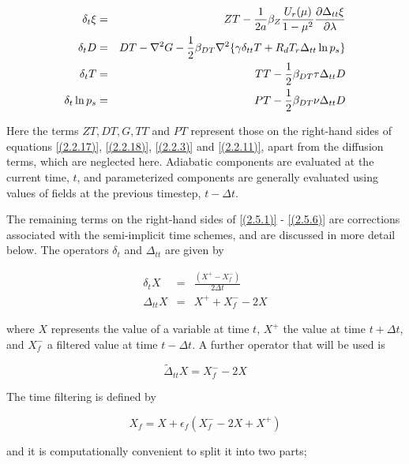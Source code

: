 \begin{eqnarray}
\delta_t\xi & = & ZT -\frac{1}{2a}\beta_{Z}\frac{U_r(\mu)}{1-\mu^2}
\frac {\partial \Delta_{tt}\xi} {\partial \lambda}
\label{(2.5.1)}\\
\delta_tD & = & DT - \nabla^2G -\frac{1}{2}\beta_{DT}\nabla^2
\{\gamma\delta_{tt}T + R_dT_r\Delta_{tt}\ln{p_s}\}
\label{(2.5.4)}\\
\delta_tT & = &  TT -\frac{1}{2}\beta_{DT}\tau
\Delta_{tt}D
\label{(2.5.5)}\\
\delta_t\ln{p_s} & = &  PT -\frac{1}{2}\beta_{DT}\nu
\Delta_{tt}D
\label{(2.5.6)}
\end{eqnarray}

Here the terms $ZT, DT, G, TT$ and $PT$ represent those on the
right-hand sides of equations \ref{(2.2.17)}, \ref{(2.2.18)},
\ref{(2.2.3)} and \ref{(2.2.11)}, apart from the diffusion terms,
which are neglected here. Adiabatic components are evaluated at the
current time, $t$, and parameterized components are generally evaluated
using values of fields at the previous timestep, $t-\Delta t$.

The remaining terms on the right-hand sides of \ref{(2.5.1)} - \ref{(2.5.6)}
 are corrections associated with the semi-implicit time schemes, and are
discussed in more detail below. The operators $\delta_t$ and $\Delta_{tt}$ 
are given by

\begin{eqnarray}
\delta_tX & = & \frac{(X^+ - X^-_f)}{2\Delta t}
\label{(2.5.7)}\\
\Delta_{tt}X & = & X^+ + X^-_f - 2X
\label{(2.5.8)}
\end{eqnarray}

where $X$ represents the value of a variable at time $t$, $X^+$ the value
at time  $t + \Delta t$, and $X^-_f$ a filtered value at time  $t - \Delta t$.
 A further operator that will be used is


\begin{equation}
\tilde\Delta_{tt}X = X^-_f - 2X
\label{(2.5.9)}
\end{equation}

The time filtering is defined by

\begin{equation}
X_f = X + \epsilon _f (X^-_f - 2X + X^+)
\label{(2.5.10)}
\end{equation}

and it is computationally convenient to split it into two parts;


